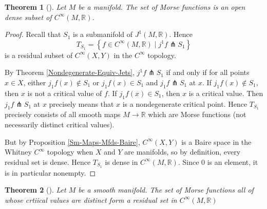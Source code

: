 \documentclass[reqno]{amsart}
\newtheorem{theorem}{Theorem}[section]
\theoremstyle{definition}
\theoremstyle{remark}
\begin{document}
 \begin{theorem}[]\label{Morse-Functions-Open-Dense}
         Let $M$ be a manifold. The set of Morse
         functions is an open dense subset of
         $C^{\infty}(M,\mathbb{R})$.
     \end{theorem}

 \begin{proof}


     Recall that $S_1 $ is a submanifold of
     $J^{1}(M, \mathbb{R})$.
     Hence
     \[
     T_{S_1} = 
     \left\{ f \in C^{\infty}(M,\mathbb{R})
      \mid j^{1}f \pitchfork S_1 \right\} 
     \] 
     is a residual subset of
     $C^{\infty}(X,Y)$ in the $C^{\infty}$ topology.

     By Theorem \ref{Nondegenerate-Equiv-Jets},
     $j^{1}f \pitchfork S_1$ if and only if
     for all points
     $x \in X$, either
     $j_1f (x) \not\in S_1$ or
     $j_1f(x) \in S_1$ and
     $j_1f \pitchfork S_1$ at $x$.
     If $j_1f(x) \not\in S_1$, then
     $x$ is not a critical value of $f$.
     If $j_1f(x) \in S_1$, then
     $x$ is a critical value. Then
     $j_1f \pitchfork S_1$ at $x$ precisely means
     that $x$ is a nondegenerate critical point.
     Hence
     $T_{S_1}$ precisely consists of all
     smooth maps $M \to \mathbb{R}$ which are Morse functions
     (not necessarily distinct critical values).

     But by Proposition \ref{Sm-Maps-Mfds-Baire},
     $C^{\infty}(X,Y)$ is a Baire space in the
     Whitney $C^{\infty}$ topology when
     $X$ and $Y$ are manifolds, so by
     definition, every residual set is dense. Hence
     $T_{S_1}$ is dense in
     $C^{\infty}(M,\mathbb{R})$. Since 
     $0$ is an element, it is in particular nonempty.

 \end{proof}

 \begin{theorem}[]
     Let $M$ be a smooth manifold.
     The set of Morse functions all of whose
     crtiical values are distinct form a residual set
     in $C^{\infty}(M, \mathbb{R})$
 \end{theorem}
\end{document}
